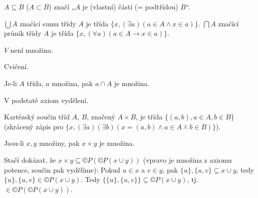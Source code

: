 \documentclass[12pt]{article}                   %
\begin{document}
        \begin{definice}[Inkluze]
            $A \subseteq B$ ($A \subset B$) značí „$A$ je (vlastní) částí (= podtřídou) $B$“.
        \end{definice}

        \begin{definice}
            $\bigcup A$ značící sumu třídy $A$ je třída $\{x, (\exists a)(a \in A \land x \in a)\}$. $\bigcap A$ značící průnik třídy $A$ je třída $\{x, (\forall a)(a \in A \rightarrow x \in a)\}$.
        \end{definice}

        \begin{lemma}
            $V$ není množina.

            \begin{dukazin}
                Cvičení.
            \end{dukazin}
        \end{lemma}

        \begin{lemma}
            Je-li $A$ třída, $a$ množina, pak $a \cap A$ je množina.

            \begin{dukazin}
                V podstatě axiom vydělení.
            \end{dukazin}
        \end{lemma}


        \begin{definice}
            Kartézský součin tříd $A$, $B$, značený $A \times B$, je třída $\{(a, b), a \in A, b \in B\}$ (zkrácený zápis pro $\{x, (\exists a)(\exists b)(x = (a, b) \land a \in A \land b \in B)\}$).
        \end{definice}

        \begin{lemma}
            Jsou-li $x, y$ množiny, pak $x \times y$ je množina.

            \begin{dukazin}
                Stačí dokázat, že $x\times y \subseteq ©P(©P(x \cup y))$ (vpravo je množina z axiomu potence, součin pak vydělíme): Pokud $u \in x$ a $v \in y$, pak $\{u\}, \{u, v\} \subseteq x \cup y$, tedy $\{u\}, \{u, v\} \in ©P(x \cup y)$. Tedy $\{\{u\}, \{u, v\}\} \subseteq ©P(x \cup y)$, tj. $\in ©P(©P(x \cup y))$.
            \end{dukazin}
        \end{lemma}
\end{document}
